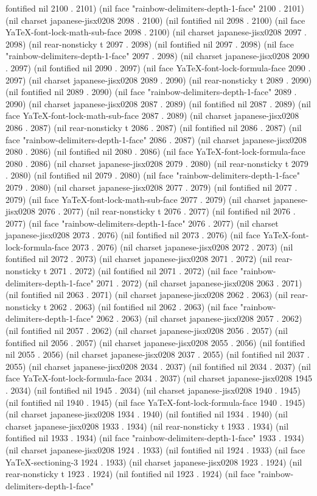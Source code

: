 fontified nil 2100 . 2101) (nil face "rainbow-delimiters-depth-1-face" 2100 . 2101) (nil charset japanese-jisx0208 2098 . 2100) (nil fontified nil 2098 . 2100) (nil face YaTeX-font-lock-math-sub-face 2098 . 2100) (nil charset japanese-jisx0208 2097 . 2098) (nil rear-nonsticky t 2097 . 2098) (nil fontified nil 2097 . 2098) (nil face "rainbow-delimiters-depth-1-face" 2097 . 2098) (nil charset japanese-jisx0208 2090 . 2097) (nil fontified nil 2090 . 2097) (nil face YaTeX-font-lock-formula-face 2090 . 2097) (nil charset japanese-jisx0208 2089 . 2090) (nil rear-nonsticky t 2089 . 2090) (nil fontified nil 2089 . 2090) (nil face "rainbow-delimiters-depth-1-face" 2089 . 2090) (nil charset japanese-jisx0208 2087 . 2089) (nil fontified nil 2087 . 2089) (nil face YaTeX-font-lock-math-sub-face 2087 . 2089) (nil charset japanese-jisx0208 2086 . 2087) (nil rear-nonsticky t 2086 . 2087) (nil fontified nil 2086 . 2087) (nil face "rainbow-delimiters-depth-1-face" 2086 . 2087) (nil charset japanese-jisx0208 2080 . 2086) (nil fontified nil 2080 . 2086) (nil face YaTeX-font-lock-formula-face 2080 . 2086) (nil charset japanese-jisx0208 2079 . 2080) (nil rear-nonsticky t 2079 . 2080) (nil fontified nil 2079 . 2080) (nil face "rainbow-delimiters-depth-1-face" 2079 . 2080) (nil charset japanese-jisx0208 2077 . 2079) (nil fontified nil 2077 . 2079) (nil face YaTeX-font-lock-math-sub-face 2077 . 2079) (nil charset japanese-jisx0208 2076 . 2077) (nil rear-nonsticky t 2076 . 2077) (nil fontified nil 2076 . 2077) (nil face "rainbow-delimiters-depth-1-face" 2076 . 2077) (nil charset japanese-jisx0208 2073 . 2076) (nil fontified nil 2073 . 2076) (nil face YaTeX-font-lock-formula-face 2073 . 2076) (nil charset japanese-jisx0208 2072 . 2073) (nil fontified nil 2072 . 2073) (nil charset japanese-jisx0208 2071 . 2072) (nil rear-nonsticky t 2071 . 2072) (nil fontified nil 2071 . 2072) (nil face "rainbow-delimiters-depth-1-face" 2071 . 2072) (nil charset japanese-jisx0208 2063 . 2071) (nil fontified nil 2063 . 2071) (nil charset japanese-jisx0208 2062 . 2063) (nil rear-nonsticky t 2062 . 2063) (nil fontified nil 2062 . 2063) (nil face "rainbow-delimiters-depth-1-face" 2062 . 2063) (nil charset japanese-jisx0208 2057 . 2062) (nil fontified nil 2057 . 2062) (nil charset japanese-jisx0208 2056 . 2057) (nil fontified nil 2056 . 2057) (nil charset japanese-jisx0208 2055 . 2056) (nil fontified nil 2055 . 2056) (nil charset japanese-jisx0208 2037 . 2055) (nil fontified nil 2037 . 2055) (nil charset japanese-jisx0208 2034 . 2037) (nil fontified nil 2034 . 2037) (nil face YaTeX-font-lock-formula-face 2034 . 2037) (nil charset japanese-jisx0208 1945 . 2034) (nil fontified nil 1945 . 2034) (nil charset japanese-jisx0208 1940 . 1945) (nil fontified nil 1940 . 1945) (nil face YaTeX-font-lock-formula-face 1940 . 1945) (nil charset japanese-jisx0208 1934 . 1940) (nil fontified nil 1934 . 1940) (nil charset japanese-jisx0208 1933 . 1934) (nil rear-nonsticky t 1933 . 1934) (nil fontified nil 1933 . 1934) (nil face "rainbow-delimiters-depth-1-face" 1933 . 1934) (nil charset japanese-jisx0208 1924 . 1933) (nil fontified nil 1924 . 1933) (nil face YaTeX-sectioning-3 1924 . 1933) (nil charset japanese-jisx0208 1923 . 1924) (nil rear-nonsticky t 1923 . 1924) (nil fontified nil 1923 . 1924) (nil face "rainbow-delimiters-depth-1-face" 